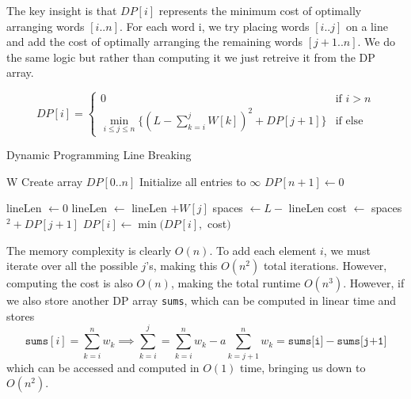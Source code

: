 \documentclass{article}
\begin{document}
    \begin{algo}
      The key insight is that $DP[i]$ represents the minimum cost of optimally arranging words $[i..n]$. For each word i, we try placing words $[i..j]$ on a line and add the cost of optimally arranging the remaining words $[j+1..n]$. We do the same logic but rather than computing it we just retreive it from the DP array. 

      \begin{equation}
        DP[i] = 
        \begin{cases}
          0 & \text{if } i > n \\
          \min_{i \leq j \leq n} \big\{ (L - \sum_{k=i}^j W[k])^2 + DP[j+1] \big\} & \text{if else} 
        \end{cases}
      \end{equation}


      \begin{algorithm}[H]
        \caption{Dynamic Programming Line Breaking}
        \label{alg:dpline}
        \begin{algorithmic}
          \State W
            \State Create array $DP[0..n]$ 
            \State Initialize all entries to $\infty$
            \State $DP[n+1] \gets 0$ 
            
              
              \State lineLen $\gets 0$
                
                \State lineLen $\gets$ lineLen $+ W[j]$
                  
                  \State spaces $\gets L -$ lineLen 
                  \State cost $\gets$ spaces$^2 + DP[j+1]$ 
                  \State $DP[i] \gets \min(DP[i],$ cost$)$ 
                \EndIf
              \EndFor
            \EndFor
            
            \State {}  
          \EndFunction
        \end{algorithmic}
      \end{algorithm}

      The memory complexity is clearly $O(n)$. To add each element $i$, we must iterate over all the possible $j$'s, making this $O(n^2)$ total iterations. However, computing the cost is also $O(n)$, making the total runtime $O(n^3)$. However, if we also store another DP array \texttt{sums}, which can be computed in linear time and stores 
      \begin{equation}
        \texttt{sums}[i] = \sum_{k=i}^n w_k \implies \sum_{k=i}^{j}  = \sum_{k=i}^n w_k - a\sum_{k=j+1}^n w_k = \texttt{sums[i]} - \texttt{sums[j+1]}
      \end{equation}
      which can be accessed and computed in $O(1)$ time, bringing us down to $O(n^2)$. 
    \end{algo}
\end{document}
